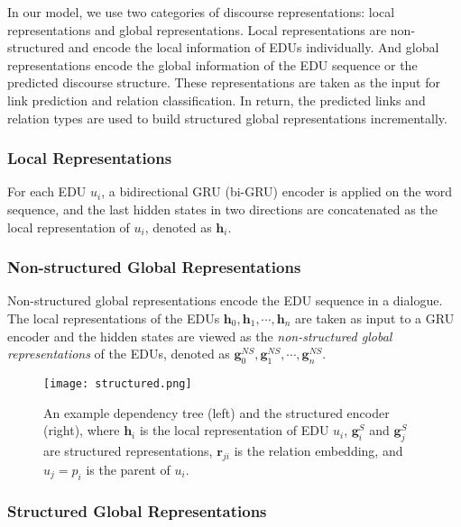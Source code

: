 \documentclass[letterpaper]{article} \usepackage{aaai19}  \usepackage{times}  \usepackage{helvet}  \usepackage{courier}  \usepackage{url}  \usepackage{graphicx}  \usepackage{amssymb}
\begin{document}
In our model, we use two categories of discourse representations: local representations and global representations.
Local representations are non-structured and encode the local information of EDUs individually.
And global representations encode the global information of the EDU sequence or the predicted discourse structure.
These representations are taken as the input for link prediction and relation classification. 
In return, the predicted links and relation types are used to build structured global representations incrementally.

\subsubsection{Local Representations}

For each EDU $u_i$, a bidirectional GRU (bi-GRU) encoder is applied on the word sequence, and the last hidden states in two directions are concatenated as the local representation of $u_i$, denoted as $\bm{h}_i$.

\subsubsection{Non-structured Global Representations}

Non-structured global representations encode the EDU sequence in a dialogue.
The local representations of the EDUs $\bm{h}_0,\bm{h}_1,\cdots,\bm{h}_n$ are taken as input to a GRU encoder and the hidden states are viewed as the \emph{non-structured global representations} of the EDUs, denoted as $\bm{g}^{NS}_0,\bm{g}^{NS}_1,\cdots,\bm{g}^{NS}_n$.

\begin{figure}[ht]
	\centering
	\texttt{[image: structured.png]}
	\caption{An example dependency tree (left) and the structured encoder (right), where $\bm{h}_i$ is the local representation of EDU $u_i$, $\bm{g}_i^S$ and $\bm{g}_j^S$ are structured representations, $\bm{r}_{ji}$ is the relation embedding, and $u_j=p_i$ is the parent of $u_i$.}
	\label{structured}
\end{figure}

\subsubsection{Structured Global Representations}
\end{document}
